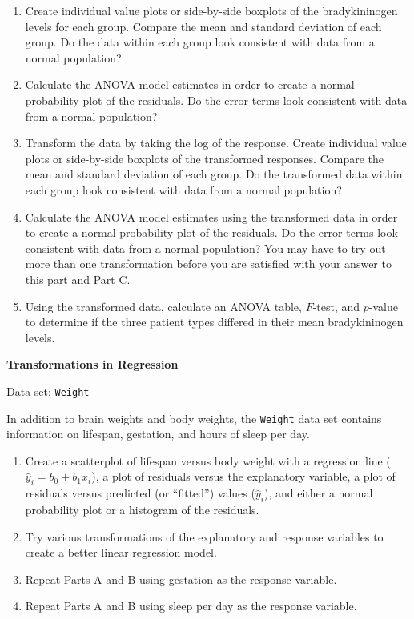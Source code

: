 \documentclass[
]{report}
\begin{document}
\begin{list}{E..}{ \setlength{\itemsep}{1.2em}}
    \begin{enumerate}
      \item Create individual value plots or side-by-side boxplots of the bradykininogen levels for each group. Compare the mean and standard deviation of each group. Do the data within each group look consistent with data from a normal population?
      \item Calculate the ANOVA model estimates in order to create a normal probability plot of the residuals. Do the error terms look consistent with data from a normal population?
      \item Transform the data by taking the log of the response. Create individual value plots or side-by-side boxplots of the transformed responses. Compare the mean and standard deviation of each group. Do the transformed data within each group look consistent with data from a normal population?
      \item Calculate the ANOVA model estimates using the transformed data in order to create a normal probability plot of the residuals. Do the error terms look consistent with data from a normal population? You may have to try out more than one transformation before you are satisfied with your answer to this part and Part C.
      \item Using the transformed data, calculate an ANOVA table, $F$-test, and $p$-value to determine if the three patient types differed in their mean bradykininogen levels.
    \end{enumerate}

  \item \textbf{Transformations in Regression}

Data set: \texttt{Weight}

In addition to brain weights and body weights, the \texttt{Weight} data set contains information on lifespan, gestation, and hours of sleep per day.

    \begin{enumerate}
      \item Create a scatterplot of lifespan versus body weight with a regression line ($\hat{y}_i = b_0 + b_1 x_i$), a plot of residuals versus the explanatory variable, a plot of residuals versus predicted (or “fitted”) values ($\hat{y}_i$), and either a normal probability plot or a histogram of the residuals.
      \item Try various transformations of the explanatory and response variables to create a better linear regression model.
      \item Repeat Parts A and B using gestation as the response variable.
      \item Repeat Parts A and B using sleep per day as the response variable.
    \end{enumerate}


\end{list}
\end{document}
